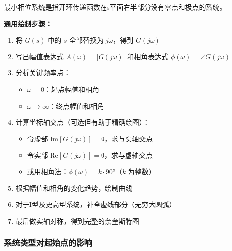 最小相位系统是指开环传递函数在s平面右半部分没有零点和极点的系统。

\textbf{通用绘制步骤：}
\begin{enumerate}
    \item 将 $G(s)$ 中的 $s$ 全部替换为 $j\omega$，得到 $G(j\omega)$
    \item 写出幅值表达式 $A(\omega) = |G(j\omega)|$ 和相角表达式 $\phi(\omega) = \angle G(j\omega)$
    \item 分析关键频率点：
    \begin{itemize}
        \item $\omega = 0$：起点幅值和相角
        \item $\omega \to \infty$：终点幅值和相角
    \end{itemize}
    \item 计算坐标轴交点（可选但有助于精确绘图）：
    \begin{itemize}
        \item 令虚部 $\text{Im}[G(j\omega)] = 0$，求与实轴交点
        \item 令实部 $\text{Re}[G(j\omega)] = 0$，求与虚轴交点
        \item 或用相角法：$\phi(\omega) = k \cdot 90°$（$k$ 为整数）
    \end{itemize}
    \item 根据幅值和相角的变化趋势，绘制曲线
    \item 对于I型及更高型系统，补全虚线部分（无穷大圆弧）
    \item 最后做实轴对称，得到完整的奈奎斯特图
\end{enumerate}

\subsubsection{系统类型对起始点的影响}

